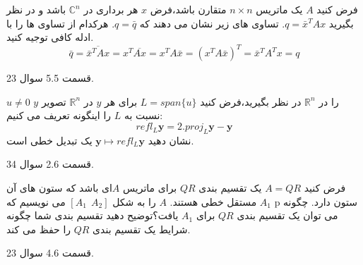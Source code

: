 \documentclass{article}
\begin{document}
	
	فرض کنید 
	$A$
	یک ماتریس 
	$n\times n$
	متقارن باشد،فرض 
	$x$
	هر برداری در 
	$\mathbb{C}^n$
	باشد و در نظر بگیرید 
	$q=\bar{x}^TAx$.
	تساوی های زیر نشان می دهند که 
	$q=\bar{q}$.
	هرکدام از تساوی ها را با ادله کافی توجیه کنید.
	$$\bar{q}=\overline{\bar{x}^TAx}=x^T\overline{Ax}=x^TA\bar{x}=(x^TA\bar{x})^T=\bar{x}^TA^Tx=q$$
	
	\begin{حل}
		قسمت 5.5 سوال 23.
	\end{حل}
	
	$u\neq 0$
	را در 
	$\mathbb{R}^n$
	در نظر بگیرید،فرض کنید 
	$L=span\{u\}$
	برای هر 
	$y$
	در 
	$\mathbb{R}^n$
	تصویر 
	$y$
	نسبت به 
	$L$
	را اینگونه تعریف می کنیم:
	$$refl_L \boldsymbol{y}=2.proj_L\boldsymbol{y}-\boldsymbol{y}$$
	نشان دهید 
	$\boldsymbol{y}\mapsto refl_L\boldsymbol{y}$
	یک تبدیل خطی است.
	\begin{حل}
		قسمت 2.6 سوال 34.
	\end{حل}
	
	
	 فرض کنید 
	$A=QR$
	یک تقسیم بندی 
	$QR$
	برای ماتریس 
	$A$ای
	باشد که ستون های آن مستقل خطی هستند.
	$A$
	را به شکل 
	$[A_1 \ \ A_2]$
	می نویسیم که 
	$A_1$
	p ستون دارد.
	چگونه می توان یک تقسیم بندی 
	$QR$
	برای 
	$A_1$
	یافت؟توضیح دهید تقسیم بندی شما چگونه شرایط یک تقسیم بندی 
	$QR$
	را حفظ می کند.
	\begin{حل}
		قسمت 4.6 سوال 23.
	\end{حل}
	
	
\end{document}
